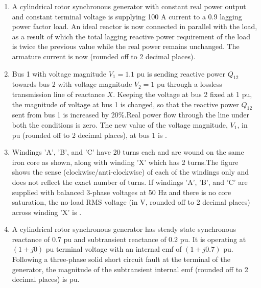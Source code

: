 \documentclass[journal,12pt,onecolumn]{IEEEtran}
\theoremstyle{remark}
\begin{document}
\begin{enumerate}
    \item A cylindrical rotor synchronous generator with constant real power output and constant terminal voltage is supplying 100 A current to a 0.9 lagging power factor load. An ideal reactor is now connected in parallel with the load, as a result of which the total lagging reactive power requirement of the load is twice the previous value while the real power remains unchanged. The armature current is now {\underline{\hspace{2cm}}}(rounded off to 2 decimal places).
   
    \item Bus 1 with voltage magnitude $V_1=1.1$ pu is sending reactive power $Q_{12}$ towards bus 2 with voltage magnitude $V_2 =1$ pu through a lossless transmission line of reactance $X$. Keeping the voltage at bus 2 fixed at 1 pu, the magnitude of voltage at bus 1 is changed, so that the reactive power $Q_{12}$ sent from bus 1 is increased by 20\%.Real power flow through the line under both the conditions is zero. The new value of the voltage magnitude, $V_1$, in pu  (rounded off to 2 decimal places), at bus 1 is {\underline{\hspace{2cm}}}.
          \begin{figure}[H]
        \centering
          
    \end{figure}
    \item Windings 'A', 'B', and 'C' have 20 turns each and are wound on the same iron core as shown, along with winding 'X' which has 2 turns.The figure shows the sense (clockwise/anti-clockwise) of each of the windings only and does not reflect the exact number of turns. If windings 'A', 'B', and 'C' are supplied with balanced 3-phase voltages at 50 Hz and there is no core saturation, the no-load RMS voltage (in V, rounded off to 2 decimal places) across winding 'X' is {\underline{\hspace{2cm}}}.
     \begin{figure}[H]
        \centering
          
    \end{figure}
    \item A cylindrical rotor synchronous generator has steady state synchronous reactance of 0.7 pu and subtransient reactance of 0.2 pu. It is operating at $(1 +j0)$ pu terminal voltage with an internal emf of $(1+j0.7)$ pu. Following a three-phase solid short circuit fault at the terminal of the generator, the magnitude of the subtransient internal emf (rounded off to 2 decimal places) is {\underline{\hspace{2cm}}} pu.
    

\end{enumerate}
\end{document}
